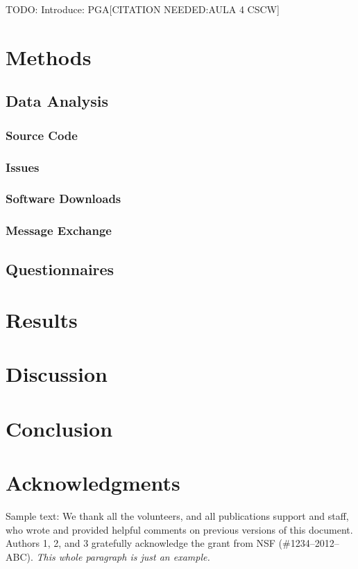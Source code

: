 \documentclass{sigchi}
\begin{document}
TODO: Introduce: PGA[CITATION NEEDED:AULA 4 CSCW]


\section{Methods}

\subsection{Data Analysis}

\subsubsection{Source Code}

\subsubsection{Issues}

\subsubsection{Software Downloads}

\subsubsection{Message Exchange}

\subsection{Questionnaires}

\section{Results}

\section{Discussion}

\section{Conclusion}

\section{Acknowledgments}

Sample text: We thank all the volunteers, and all publications support
and staff, who wrote and provided helpful comments on previous
versions of this document. Authors 1, 2, and 3 gratefully acknowledge
the grant from NSF (\#1234--2012--ABC). \textit{This whole paragraph is
  just an example.}
\end{document}
